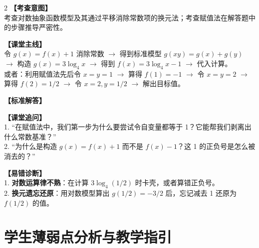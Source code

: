 \documentclass[11pt,a4paper]{ctexart}
\begin{document}
\begin{paracol}{2}
  \textbf{【考查意图】}\\
  考查对数抽象函数模型及其通过平移消除常数项的换元法；考查赋值法在解答题中的步骤推导严密性。
  
  \textbf{【课堂主线】}\\
  令 \(g(x)=f(x)+1\) 消除常数 \(\to\) 得到标准模型 \(g(xy)=g(x)+g(y)\) \(\to\) 构造 \(g(x)=3\log_4 x\) \(\to\) 得到 \(f(x)=3\log_4 x-1\) \(\to\) 代入计算。\\
  或者：利用赋值法先后令 \(x=y=1\) \(\to\) 算得 \(f(1)=-1\) \(\to\) 令 \(x=y=2\) \(\to\) 算得 \(f(2)=1/2\) \(\to\) 令 \(x=2, y=1/2\) \(\to\) 解出目标值。
  
  \textbf{【标准解答】}\\
  \qSevenSolution
  
  \textbf{【课堂追问】}\\
  1. “在赋值法中，我们第一步为什么要尝试令自变量都等于 1？它能帮我们剥离出什么常数基准？”\\
  2. “为什么是构造 \(g(x)=f(x)+1\) 而不是 \(f(x)-1\)？这 1 的正负号是怎么被消去的？”
  
  \switchcolumn
  \textbf{【易错诊断】}\\
  1. \textbf{对数运算律不熟}：在计算 \(3\log_4(1/2)\) 时卡壳，或者算错正负号。\\
  2. \textbf{换元遗忘还原}：用对数模型算出 \(g(1/2) = -3/2\) 后，忘记减去 1 还原为 \(f(1/2)\) 的值。
\end{paracol}

\vspace{0.8em}
\par{}
\vspace{0.8em}

\newpage

\section{学生薄弱点分析与教学指引}

\begingroup
\linespread{1.4}\selectfont
\end{document}
